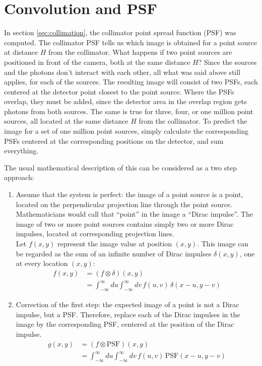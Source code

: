 \documentclass[11pt,oneside]{book}
\begin{document}
\newpage
\section{Convolution and PSF} \label{app:convolution}
In section \ref{sec:collimation}, the collimator point spread function (PSF)
was computed. The collimator PSF tells us which image is obtained for a point
source at distance $H$ from the collimator. What happens if two point sources
are positioned in front of the camera, both at the same distance $H$? Since
the sources and the photons don't interact with each other, all what was said
above still applies, for each of the sources. The resulting image will consist
of two PSFs, each centered at the detector point closest to the point
source. Where the PSFs overlap, they must be added, since the detector area
in the overlap region gets photons from both sources. The same is true for
three, four, or one million point sources, all located at the same distance
$H$ from the collimator. To predict the image for a set of one million point
sources, simply calculate the corresponding PSFs centered at the
corresponding positions on the detector, and sum everything.

The usual mathematical description of this can be considered as a two step
approach:
\begin{enumerate}
\item
Assume that the system is perfect: the image of a point source is a point,
located on the perpendicular projection line through the point source.
Mathematicians would call that ``point'' in the image a ``Dirac impulse''.
The image of two or more point sources contains simply two or more Dirac
impulses, located at corresponding projection lines.\\
%
Let $f(x,y)$ represent the image value at position $(x,y)$. This image
can be regarded as the sum of an infinite number of Dirac impulses
$\delta(x,y)$, one at every location $(x,y)$:
\begin{align}
f(x,y) &= (f \otimes \delta) (x,y)\\
       &= \int_{-\infty}^{\infty} du \int_{-\infty}^{\infty} dv \, f(u,v) \, \delta(x-u, y-v)
\end{align}

\item
Correction of the first step: the expected image of a point is not a Dirac
impulse, but a PSF. Therefore, replace each of the Dirac impulses in the image
by the corresponding PSF, centered at the position of the Dirac impulse.
\begin{align}
g(x,y) &= (f \otimes \mbox{PSF}) (x,y)\\
       &= \int_{-\infty}^{\infty} du \int_{-\infty}^{\infty} dv \, f(u,v) \, \mbox{PSF}(x-u, y-v)
\end{align}
\end{enumerate}
\end{document}
